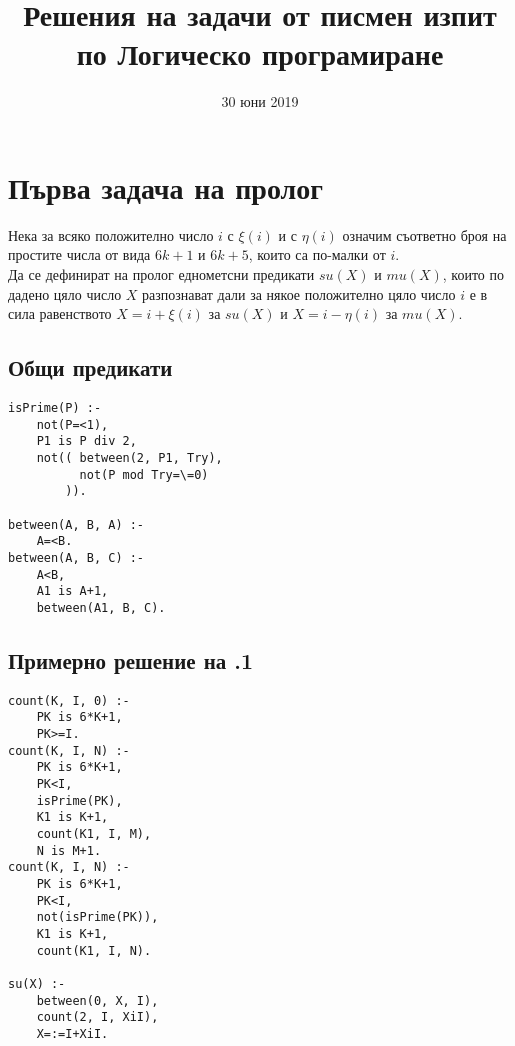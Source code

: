 \documentclass[12pt]{article}
\title{Решения на задачи от писмен изпит по Логическо програмиране}
\date{30 юни 2019}
\newenvironment{longlisting}{\captionsetup{type=listing}}{}
\begin{document}
\maketitle %
\newpage
\tableofcontents
\newpage %
\section{Първа задача на пролог}
Нека за всяко положително число $i$ с $\xi(i)$ и с $\eta(i)$ означим съответно броя на простите числа от вида $6k+1$ и $6k+5$, които са по-малки от $i$. \\
Да се дефинират на пролог еднометсни предикати $su(X)$ и $mu(X)$, които по дадено цяло число $X$ разпознават дали за някое положително цяло число $i$ е в сила равенството $X=i + \xi(i)$ за $su(X)$ и  $X=i - \eta(i)$ за  $mu(X)$.\\
\subsection{Общи предикати}
\begin{longlisting}
\begin{verbatim}
isPrime(P) :-
    not(P=<1),
    P1 is P div 2,
    not(( between(2, P1, Try),
          not(P mod Try=\=0)
        )).

between(A, B, A) :-
    A=<B.
between(A, B, C) :- 
    A<B,
    A1 is A+1,
    between(A1, B, C).
\end{verbatim}
\end{longlisting}

\vskip 0.2in

\subsection{Примерно решение на .1} 
\begin{longlisting}
    \begin{verbatim}
count(K, I, 0) :-
    PK is 6*K+1,
    PK>=I.
count(K, I, N) :-
    PK is 6*K+1,
    PK<I,
    isPrime(PK),
    K1 is K+1,
    count(K1, I, M),
    N is M+1.
count(K, I, N) :-
    PK is 6*K+1,
    PK<I,
    not(isPrime(PK)),
    K1 is K+1,
    count(K1, I, N).

su(X) :-
    between(0, X, I),
    count(2, I, XiI),
    X=:=I+XiI.
\end{verbatim}
\end{longlisting}
\end{document}
